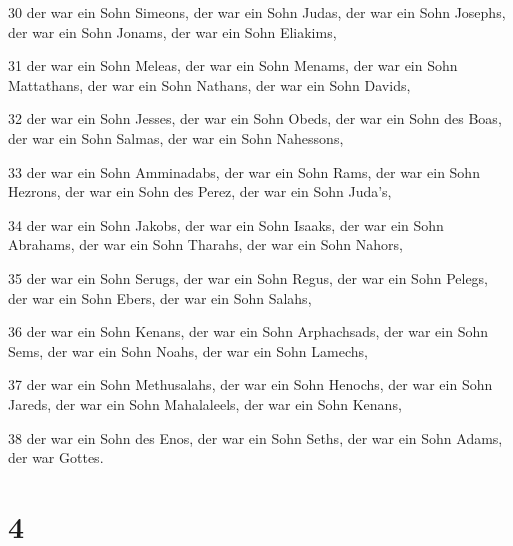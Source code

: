 \par 30 der war ein Sohn Simeons, der war ein Sohn Judas, der war ein Sohn Josephs, der war ein Sohn Jonams, der war ein Sohn Eliakims,
\par 31 der war ein Sohn Meleas, der war ein Sohn Menams, der war ein Sohn Mattathans, der war ein Sohn Nathans, der war ein Sohn Davids,
\par 32 der war ein Sohn Jesses, der war ein Sohn Obeds, der war ein Sohn des Boas, der war ein Sohn Salmas, der war ein Sohn Nahessons,
\par 33 der war ein Sohn Amminadabs, der war ein Sohn Rams, der war ein Sohn Hezrons, der war ein Sohn des Perez, der war ein Sohn Juda's,
\par 34 der war ein Sohn Jakobs, der war ein Sohn Isaaks, der war ein Sohn Abrahams, der war ein Sohn Tharahs, der war ein Sohn Nahors,
\par 35 der war ein Sohn Serugs, der war ein Sohn Regus, der war ein Sohn Pelegs, der war ein Sohn Ebers, der war ein Sohn Salahs,
\par 36 der war ein Sohn Kenans, der war ein Sohn Arphachsads, der war ein Sohn Sems, der war ein Sohn Noahs, der war ein Sohn Lamechs,
\par 37 der war ein Sohn Methusalahs, der war ein Sohn Henochs, der war ein Sohn Jareds, der war ein Sohn Mahalaleels, der war ein Sohn Kenans,
\par 38 der war ein Sohn des Enos, der war ein Sohn Seths, der war ein Sohn Adams, der war Gottes.

\chapter{4}

